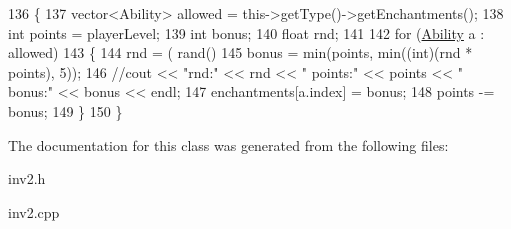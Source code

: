 \begin{DoxyCode}
136 \{
137     vector<Ability> allowed = this->getType()->getEnchantments();
138     \textcolor{keywordtype}{int} points = playerLevel;
139     \textcolor{keywordtype}{int} bonus;
140     \textcolor{keywordtype}{float} rnd;
141 
142     \textcolor{keywordflow}{for} (\hyperlink{class_ability}{Ability} a : allowed)
143     \{
144         rnd = ( rand() %
145         bonus = min(points, min((\textcolor{keywordtype}{int})(rnd * points), 5));
146         \textcolor{comment}{//cout << "rnd:" << rnd << "  points:" << points << "  bonus:" << bonus << endl;}
147         enchantments[a.index] = bonus;
148         points -= bonus;
149     \}
150 \}
\end{DoxyCode}


The documentation for this class was generated from the following files\+:\begin{DoxyCompactItemize}
\item 
inv2.\+h\item 
inv2.\+cpp\end{DoxyCompactItemize}
